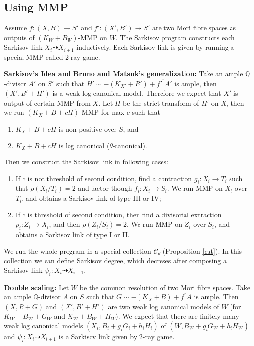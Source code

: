 \documentclass{article}
\begin{document}
\subsection{Using MMP}
Assume $f:(X,B)\to S'$ and $f':(X',B')\to S'$ are two Mori fibre spaces as outputs of $(K_{W}+B_{W})$-MMP on $W$. The Sarkisov program constructs each Sarkisov link $X_{i}\dashrightarrow X_{i+1}$ inductively. Each Sarkisov link is given by running a special MMP called 2-ray game.

\textbf{Sarkisov's Idea and Bruno and Matsuk's generalization:} Take an ample $\mathbb{Q}$-divisor $A'$ on $S'$ such that $H'\sim -(K_{X'}+B') +f'^*A'$  is ample, then $(X',B'+H')$ is a weak log canonical model. Therefore we expect that $X'$ is output of certain MMP from $X$. Let $H$ be the strict transform of $H'$ on $X$, then we run $(K_{X}+B+cH)$-MMP for max  $c$ such that
\begin{enumerate}
  \item $K_{X}+B+cH$ is non-positive over $S$, and 
  \item $K_{X}+B+cH$ is log canonical ($\theta$-canonical).
\end{enumerate}
Then we construct the Sarkisov link in following cases:
\begin{enumerate}
  \item If $c$ is not threshold of second condition, find a contraction $g_{i}:X_{i} \to T_{i}$ such that $\rho(X_{i}/T_{i})=2$ and factor though $f_{i}:X_{i} \to S_{i}$.  We run MMP on  $X_{i} $ over $T_{i}$, and obtains a Sarkisov link of type III or IV;
  \item If $c$ is threshold of second condition, then find a divisorial extraction $p_{i}:Z_{i}\to X_{i}$, and then $\rho(Z_{i}/S_{i})=2$.  We run MMP on $Z_{i}$ over $S_{i}$, and obtains a Sarkisov link of type I or II. 
\end{enumerate}
We run the whole program in a special collection $\mathcal{C}_{\theta}$ (Proposition \ref{cat}). In this collection we can define Sarkisov degree, which decreses after composing a Sarkisov link $\psi_{i}:X_{i}\dashrightarrow X_{i+1}$.

\textbf{Double scaling:} Let $W$ be the common resolution of two Mori fibre spaces. Take an ample $\mathbb{Q}$-divisor $A$ on $S$ such that $G\sim -(K_{X}+B) +f^*A$  is ample. Then  $(X,B+G)$ and $(X',B'+H')$ are two weak log canonical models of $W$ (for $K_{W}+B_{W}+G_{W}$ and $K_{W}+B_{W}+H_{W}$). We expect that there are finitely many weak log canonical models $(X_{i},B_{i}+g_{i}G_{i}+h_{i}H_{i})$ of $(W,B_{W}+g_{i}G_{W}+h_{i}H_{W})$ and $\psi_{i}:X_{i}\dashrightarrow X_{i+1}$ is a Sarkisov link given by $2$-ray game.
\end{document}
